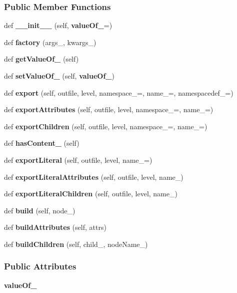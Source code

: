 \subsubsection*{Public Member Functions}
\begin{DoxyCompactItemize}
\item 
def {\bf \+\_\+\+\_\+init\+\_\+\+\_\+} (self, {\bf value\+Of\+\_\+}=\textquotesingle{}\textquotesingle{})
\item 
def {\bf factory} (args\+\_\+, kwargs\+\_\+)
\item 
def {\bf get\+Value\+Of\+\_\+} (self)
\item 
def {\bf set\+Value\+Of\+\_\+} (self, {\bf value\+Of\+\_\+})
\item 
def {\bf export} (self, outfile, level, namespace\+\_\+=\textquotesingle{}\textquotesingle{}, name\+\_\+=\textquotesingle{}, namespacedef\+\_\+=\textquotesingle{}\textquotesingle{})
\item 
def {\bf export\+Attributes} (self, outfile, level, namespace\+\_\+=\textquotesingle{}\textquotesingle{}, name\+\_\+=\textquotesingle{})
\item 
def {\bf export\+Children} (self, outfile, level, namespace\+\_\+=\textquotesingle{}\textquotesingle{}, name\+\_\+=\textquotesingle{})
\item 
def {\bf has\+Content\+\_\+} (self)
\item 
def {\bf export\+Literal} (self, outfile, level, name\+\_\+=\textquotesingle{})
\item 
def {\bf export\+Literal\+Attributes} (self, outfile, level, name\+\_\+)
\item 
def {\bf export\+Literal\+Children} (self, outfile, level, name\+\_\+)
\item 
def {\bf build} (self, node\+\_\+)
\item 
def {\bf build\+Attributes} (self, attrs)
\item 
def {\bf build\+Children} (self, child\+\_\+, node\+Name\+\_\+)
\end{DoxyCompactItemize}
\subsubsection*{Public Attributes}
\begin{DoxyCompactItemize}
\item 
{\bf value\+Of\+\_\+}
\end{DoxyCompactItemize}
